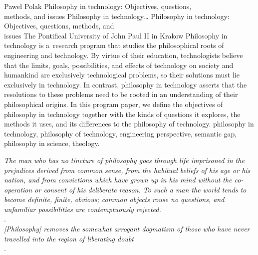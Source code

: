 \begin{artengenv}{Paweł Polak}
	{Philosophy in technology: Objectives, questions,\\methods, and issues}
	{Philosophy in technology\ldots}
	{Philosophy in technology: Objectives, questions, methods, and\\issues}
	{The Pontifical University of John Paul II in Krakow}
	{Philosophy in technology is a~research program that studies the philosophical roots of engineering and technology. By virtue of their education, technologists believe that the limits, goals, possibilities, and effects of technology on society and humankind are exclusively technological problems, so their solutions must lie exclusively in technology. In contrast, philosophy in technology asserts that the resolutions to these problems need to be rooted in an understanding of their philosophical origins. In this program paper, we define the objectives of philosophy in technology together with the kinds of questions it explores, the methods it uses, and its differences to the philosophy of technology. \enlargethispage{2.5\baselineskip}
	}
	{philosophy in technology, philosophy of technology, engineering perspective, semantic gap, philosophy in science, theology.}


\begin{customepigraph}
\textit{The man who has no tincture of philosophy goes through life imprisoned in the prejudices derived from common sense, from the habitual beliefs of his age or his nation, and from convictions which have grown up in his mind without the co-operation or consent of his deliberate reason. To such a man the world tends to become definite, finite, obvious; common objects rouse no questions, and unfamiliar possibilities are contemptuously rejected.} \\
\parencite[][p.243]{russell_problems_1912}. \\

\noindent\textit{[Philosophy] removes the somewhat arrogant dogmatism of those who have never travelled into the region of liberating doubt} \\
\parencite[][pp.243–244]{russell_problems_1912}. \\
\end{customepigraph}




\end{artengenv}
